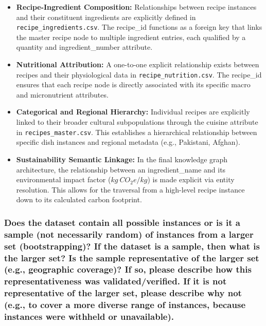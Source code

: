 \documentclass{article}
\newcommand{\question}[1]{#1}
\begin{document}
\begin{itemize}
    \item \textbf{Recipe-Ingredient Composition:} Relationships between recipe instances and their constituent ingredients are explicitly defined in \texttt{recipe\_ingredients.csv}. The recipe\_id functions as a foreign key that links the master recipe node to multiple ingredient entries, each qualified by a quantity and ingredient\_number attribute.
    \item \textbf{Nutritional Attribution:} A one-to-one explicit relationship exists between recipes and their physiological data in \texttt{recipe\_nutrition.csv}. The recipe\_id ensures that each recipe node is directly associated with its specific macro and micronutrient attributes.
    \item \textbf{Categorical and Regional Hierarchy:} Individual recipes are explicitly linked to their broader cultural subpopulations through the cuisine attribute in \texttt{recipes\_master.csv}. This establishes a hierarchical relationship between specific dish instances and regional metadata (e.g., Pakistani, Afghan).
    \item \textbf{Sustainability Semantic Linkage:} In the final knowledge graph architecture, the relationship between an ingredient\_name and its environmental impact factor ($kg\ CO_2e/kg$) is made explicit via entity resolution. This allows for the traversal from a high-level recipe instance down to its calculated carbon footprint.
\end{itemize}

\question{\subsubsection*{Does the dataset contain all possible instances or is it a sample (not
necessarily random) of instances from a larger set (bootstrapping)? If the dataset is
a sample, then what is the larger set? Is the sample representative of the
larger set (e.g., geographic coverage)? If so, please describe how this
representativeness was validated/verified. If it is not representative of the
larger set, please describe why not (e.g., to cover a more diverse range of
instances, because instances were withheld or unavailable).}}
\end{document}
